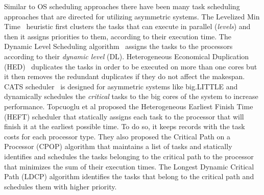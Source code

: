 Similar to OS scheduling approaches there have been many task scheduling approaches that are directed for utilizing asymmetric systems.
The Levelized Min Time~\cite{Hetero95} heuristic first clusters the tasks that can execute in parallel (\textit{levels}) and then it assigns priorities to them, according to their execution time.
The Dynamic Level Scheduling algorithm~\cite{Hetero93} assigns the tasks to the processors according to their \textit{dynamic level} (DL).
Heterogeneous Economical Duplication (HED)~\cite{Dup09} duplicates the tasks in order to be executed on more than one cores but it then
removes the redundant duplicates if they do not affect the makespan. 
CATS scheduler~\cite{Chronaki:ICS2015} is designed for asymmetric systems like big.LITTLE and dynamically schedules the \textit{critical} tasks to the big cores of the system to increase performance. 
Topcuoglu et al proposed the Heterogeneous Earliest Finish Time (HEFT) scheduler that statically assigns each task to the processor that will finish it at the earliest possible time. To do so, it keeps records with the task costs for each processor type.
They also proposed the Critical Path on a Processor (CPOP) algorithm \cite{HEFT} that maintains a list of tasks and statically identifies and schedules the tasks belonging to the critical path  to the processor that minimizes the sum of their execution times. 
The Longest Dynamic Critical Path (LDCP) algorithm \cite{LDCP} identifies the tasks that belong to the critical path and schedules them with higher priority.

